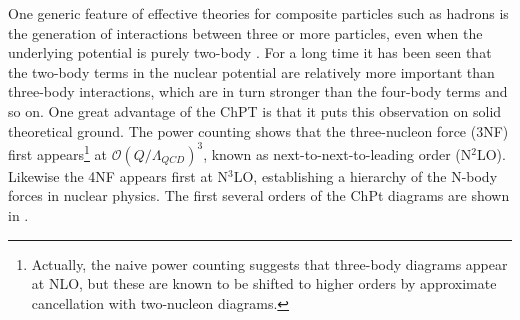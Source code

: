 One generic feature of effective theories for composite particles such as hadrons is the generation of interactions between three or more particles, even when the underlying potential is purely two-body \cite{RevModPhys.85.197}. For a long time it has been seen that the two-body terms in the nuclear potential are relatively more important than three-body interactions, which are in turn stronger than the four-body terms and so on. One great advantage of the ChPT is that it puts this observation on solid theoretical ground. The power counting shows that the three-nucleon force (3NF) first appears\footnote{Actually, the naive power counting suggests that three-body diagrams appear at NLO, but these are known to be shifted to higher orders by approximate cancellation with two-nucleon diagrams\cite{PhysRevC.49.2932}.} at $\mathcal{O}(Q/\Lambda_{QCD})^3$, known as next-to-next-to-leading order (N$^2$LO). Likewise the 4NF appears first at N$^3$LO, establishing a hierarchy of the N-body forces in nuclear physics. The first several orders of the ChPt diagrams are shown in .


